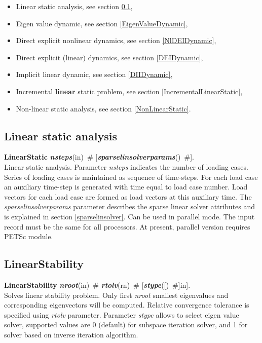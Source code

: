 \documentclass[draft]{article}
\newcommand{\param}[1]{{\em #1}}
\newcommand{\keywordnotype}[1]{\mbox{{\it{\bf{#1}}}}}
\newcommand{\keyword}[2]{\mbox{{\keywordnotype{#1}\tiny (#2)}}}
\newcommand{\entKeywordInst}[1]{\mbox{{\bf{{#1}}}}}
\newcommand{\field}[2]{\mbox{\keyword{#1}{#2}~\#}}
\newcommand{\optField}[2]{\mbox{[\field{#1}{#2}]}}
\newcommand{\Pmode}[1]{{\sffamily #1}}
\begin{document}
\begin{itemize}
\item Linear static analysis, see section \ref{LinearStatic},
\item Eigen value dynamic, see section \ref{EigenValueDynamic},
\item Direct explicit  nonlinear dynamics, see section
\ref{NlDEIDynamic},
\item Direct explicit (linear) dynamics, see section \ref{DEIDynamic},
\item Implicit linear dynamic, see section \ref{DIIDynamic},
\item Incremental {\bf linear} static problem, see section \ref{IncrementalLinearStatic},
\item Non-linear static analysis, see section \ref{NonLinearStatic}.
\end{itemize}

\subsection{Linear static analysis}
\label{LinearStatic}
\entKeywordInst{LinearStatic} \field{nsteps}{in}
\optField{sparselinsolverparams}{}.\\
Linear static analysis.
Parameter \param{nsteps} indicates the number of loading cases.
Series of loading cases is maintained as sequence of time-steps.
For each load case an auxiliary time-step is generated with time
equal to load case number.
Load vectors for each load case are formed as load vectors at
this auxiliary time.
The  \param{sparselinsolverparams} parameter describes the sparse
linear solver attributes and is explained in section \ref{sparselinsolver}.
\Pmode{Can be used in parallel mode. The input record must be the same
for all processors. At present, parallel version requires PETSc module.}


\subsection{LinearStability}
\label{LinearStability}
\entKeywordInst{LinearStability} \field{nroot}{in}
\field{rtolv}{rn} \optField{stype}[in].\\
Solves linear stability problem. Only first \param{nroot} smallest
eigenvalues and corresponding eigenvectors will be computed. 
Relative convergence tolerance is specified using \param{rtolv} parameter.
Parameter \param{stype} allows to select eigen value solver, supported
values are 0 (default) for subspace iteration solver, and 1 for solver
based on inverse iteration algorithm.
\end{document}

